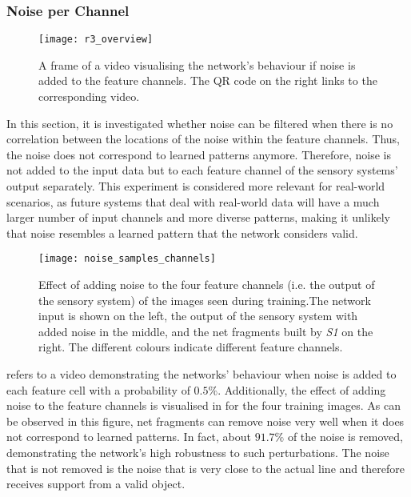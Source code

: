 \subsubsection{Noise per Channel}
%
\begin{figure}[h]
    \centering
    \texttt{[image: r3\_overview]}
    \caption[Video visualising the network's behaviour with noise in the feature channels]{A frame of a video visualising the network's behaviour if noise is added to the feature channels. The QR code on the right links to the corresponding video.}
\end{figure}
%
In this section, it is investigated whether noise can be filtered when there is no correlation between the locations of the noise within the feature channels.
Thus, the noise does not correspond to learned patterns anymore.
Therefore, noise is not added to the input data but to each feature channel of the sensory systems' output separately.
This experiment is considered more relevant for real-world scenarios, as future systems that deal with real-world data will have a much larger number of input channels and more diverse patterns, making it unlikely that noise resembles a learned pattern that the network considers valid.

\begin{figure}[h!]
    \centering
    \texttt{[image: noise\_samples\_channels]}
    \caption[Effect of adding noise to the feature channels]{Effect of adding noise to the four feature channels (i.e. the output of the sensory system) of the images seen during training.The network input is shown on the left, the output of the sensory system with added noise in the middle, and the net fragments built by \emph{S1} on the right. The different colours indicate different feature channels.}
\end{figure}
%
 refers to a video demonstrating the networks' behaviour when noise is added to each feature cell with a probability of $0.5\%$.
Additionally, the effect of adding noise to the feature channels is visualised in  for the four training images.
As can be observed in this figure, net fragments can remove noise very well when it does not correspond to learned patterns.
In fact, about $91.7\%$ of the noise is removed, demonstrating the network's high robustness to such perturbations.
The noise that is not removed is the noise that is very close to the actual line and therefore receives support from a valid object.

